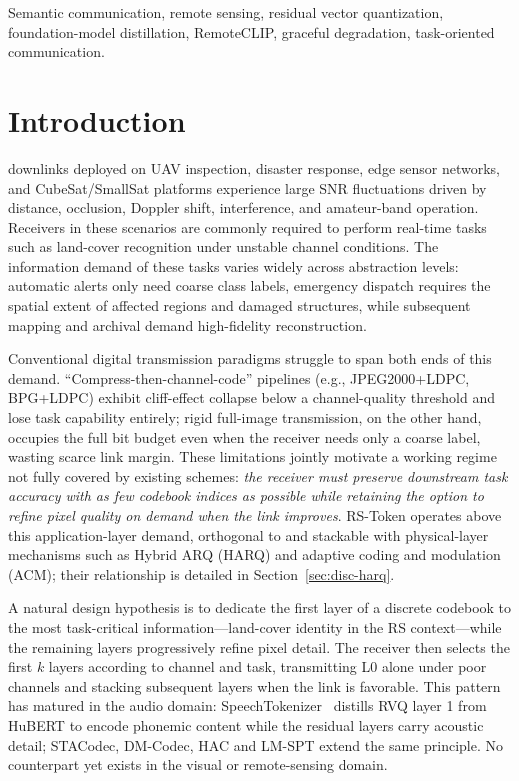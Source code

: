 \documentclass[lettersize,journal]{IEEEtran}
\begin{document}
\begin{IEEEkeywords}
Semantic communication, remote sensing, residual vector quantization, foundation-model distillation, RemoteCLIP, graceful degradation, task-oriented communication.
\end{IEEEkeywords}

\section{Introduction}
 downlinks deployed on UAV inspection, disaster response, edge sensor networks, and CubeSat/SmallSat platforms experience large SNR fluctuations driven by distance, occlusion, Doppler shift, interference, and amateur-band operation. Receivers in these scenarios are commonly required to perform real-time tasks such as land-cover recognition under unstable channel conditions. The information demand of these tasks varies widely across abstraction levels: automatic alerts only need coarse class labels, emergency dispatch requires the spatial extent of affected regions and damaged structures, while subsequent mapping and archival demand high-fidelity reconstruction.

Conventional digital transmission paradigms struggle to span both ends of this demand. ``Compress-then-channel-code'' pipelines (e.g., JPEG2000+LDPC, BPG+LDPC) exhibit cliff-effect collapse below a channel-quality threshold and lose task capability entirely; rigid full-image transmission, on the other hand, occupies the full bit budget even when the receiver needs only a coarse label, wasting scarce link margin. These limitations jointly motivate a working regime not fully covered by existing schemes: \emph{the receiver must preserve downstream task accuracy with as few codebook indices as possible while retaining the option to refine pixel quality on demand when the link improves}. RS-Token operates above this application-layer demand, orthogonal to and stackable with physical-layer mechanisms such as Hybrid ARQ (HARQ) and adaptive coding and modulation (ACM); their relationship is detailed in Section~\ref{sec:disc-harq}.

A natural design hypothesis is to dedicate the first layer of a discrete codebook to the most task-critical information---land-cover identity in the RS context---while the remaining layers progressively refine pixel detail. The receiver then selects the first $k$ layers according to channel and task, transmitting L0 alone under poor channels and stacking subsequent layers when the link is favorable. This pattern has matured in the audio domain: SpeechTokenizer~\cite{zhang2024speechtokenizer} distills RVQ layer 1 from HuBERT to encode phonemic content while the residual layers carry acoustic detail; STACodec, DM-Codec, HAC and LM-SPT extend the same principle. No counterpart yet exists in the visual or remote-sensing domain.
\end{document}
